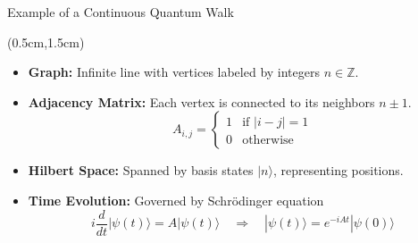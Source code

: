 \documentclass{beamer}
\theoremstyle{definition}
\begin{document}
\begin{frame}{Example of a Continuous Quantum Walk}
    \begin{textblock*}{12cm}(0.5cm,1.5cm)
        \centering
        
        \begin{itemize}
        \vspace{0.5cm}
        \item \textbf{Graph:} Infinite line with vertices labeled by integers \( n \in \mathbb{Z} \).
        \item \textbf{Adjacency Matrix:} Each vertex is connected to its neighbors \( n \pm 1 \).
        \[
        A_{i,j} = \begin{cases}
            1 & \text{if } |i - j| = 1 \\
            0 & \text{otherwise}
        \end{cases}
        \]

        \item \textbf{Hilbert Space:} Spanned by basis states \( |n\rangle \), representing positions.
        \item \textbf{Time Evolution:} Governed by Schrödinger equation
        \[
        i \frac{d}{dt} |\psi(t)\rangle = A |\psi(t)\rangle
        \quad \Rightarrow \quad
        |\psi(t)\rangle = e^{-iAt} |\psi(0)\rangle
        \]
    \end{itemize}
            
    \end{textblock*}
\end{frame}
\end{document}
